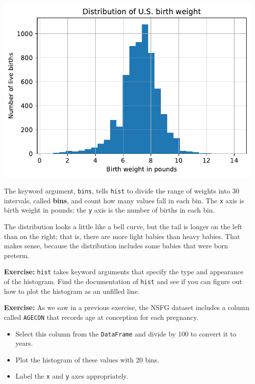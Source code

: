 \begin{center}
\includegraphics[scale=0.75]{07_dataframes_files/07_dataframes_60_0.pdf}
\end{center}

The keyword argument, \passthrough{\lstinline!bins!}, tells
\passthrough{\lstinline!hist!} to divide the range of weights into 30
intervals, called \textbf{bins}, and count how many values fall in each
bin. The \passthrough{\lstinline!x!} axis is birth weight in pounds; the
\passthrough{\lstinline!y!} axis is the number of births in each bin.

The distribution looks a little like a bell curve, but the tail is
longer on the left than on the right; that is, there are more light
babies than heavy babies. That makes sense, because the distribution
includes some babies that were born preterm.

\textbf{Exercise:} \passthrough{\lstinline!hist!} takes keyword
arguments that specify the type and appearance of the histogram. Find
the documentation of \passthrough{\lstinline!hist!} and see if you can
figure out how to plot the histogram as an unfilled line.

\textbf{Exercise:} As we saw in a previous exercise, the NSFG dataset
includes a column called \passthrough{\lstinline!AGECON!} that records
age at conception for each pregnancy.

\begin{itemize}
\item
  Select this column from the \passthrough{\lstinline!DataFrame!} and
  divide by 100 to convert it to years.
\item
  Plot the histogram of these values with 20 bins.
\item
  Label the \passthrough{\lstinline!x!} and \passthrough{\lstinline!y!}
  axes appropriately.
\end{itemize}

